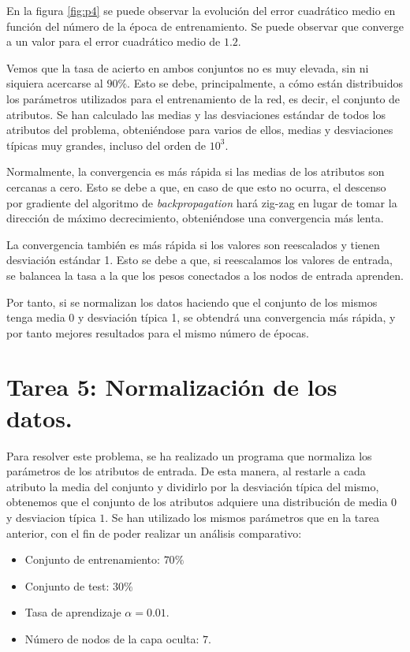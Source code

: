 \documentclass[spanish]{assignment}
\begin{document}
	En la figura \ref{fig:p4} se puede observar la evolución del error cuadrático medio en función del número de la época de entrenamiento. Se puede observar que converge a un valor para el error cuadrático medio de $1.2$.
	
	
	Vemos que la tasa de acierto en ambos conjuntos no es muy elevada, sin ni siquiera acercarse al
	$90\%$. Esto se debe, principalmente, a cómo están distribuidos los parámetros utilizados para el entrenamiento de la red, es decir, el conjunto de atributos. Se han calculado las medias y las desviaciones estándar de todos los atributos del problema, obteniéndose para varios de ellos, medias y desviaciones típicas muy grandes, incluso del orden de $10^3$.
	
	Normalmente, la convergencia es más rápida si las medias de los atributos son cercanas a cero. Esto se debe a que, en caso de que esto no ocurra, el descenso por gradiente del algoritmo de \textit{backpropagation} hará zig-zag en lugar de tomar la dirección de máximo decrecimiento, obteniéndose una convergencia más lenta. 
	
	La convergencia también es más rápida si los valores son reescalados y tienen desviación estándar 1. Esto se debe a que, si reescalamos los valores de entrada, se balancea la tasa a la que los pesos conectados a los nodos de entrada aprenden.
	
	Por tanto, si se normalizan los datos haciendo que el conjunto de los mismos tenga media 0 y desviación típica 1, se obtendrá una convergencia más rápida, y por tanto mejores resultados para el mismo número de épocas.
	
	\section{Tarea 5: Normalización de los datos.}
	Para resolver este problema, se ha realizado un programa que normaliza los parámetros de los atributos de entrada. De esta manera, al restarle a cada atributo la media del conjunto y dividirlo por la desviación típica del mismo, obtenemos que el conjunto de los atributos adquiere una distribución de media $0$ y desviacion típica $1$. Se han utilizado los mismos parámetros que en la tarea anterior, con el fin de poder realizar un análisis comparativo:
	\begin{itemize}
		\item Conjunto de entrenamiento: $70\%$
		\item Conjunto de test: $30\%$
		\item Tasa de aprendizaje $\alpha = 0.01$.		
		\item Número de nodos de la capa oculta: $7$.
	\end{itemize}
	
\end{document}
